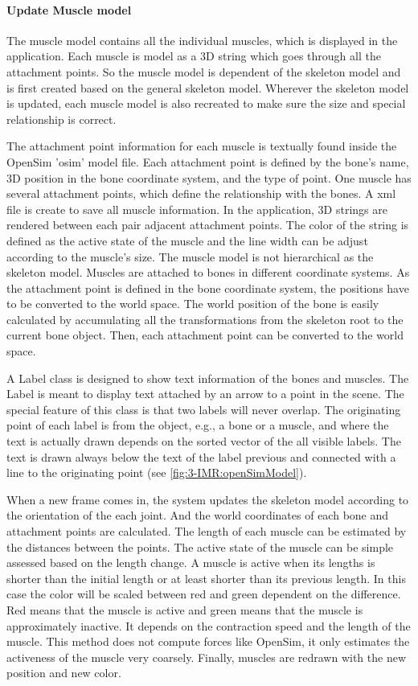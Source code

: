 \paragraph{Update Muscle model}
The muscle model contains all the individual muscles, which is displayed in the application. Each muscle is model as a 3D string which goes through all the attachment points. So the muscle model is dependent of the skeleton model and is first created based on the general skeleton model. Wherever the skeleton model is updated, each muscle model is also recreated to make sure the size and special relationship is correct. 

The attachment point information for each muscle is textually found inside the OpenSim 'osim' model file. Each attachment point is defined by the bone's name, 3D position in the bone coordinate system, and the type of point. One muscle has several attachment points, which define the relationship with the bones. A xml file is create to save all muscle information.
In the application, 3D strings are rendered between each pair adjacent attachment points. 
The color of the string is defined as the active state of the muscle and the line width can be adjust according to the muscle's size. The muscle model is not hierarchical as the skeleton model. Muscles are attached to bones in different coordinate systems. As the attachment point is defined in the bone coordinate system, the positions have to be converted to the world space. The world position of the bone is easily calculated by accumulating all the transformations from the skeleton root to the current bone object. Then, each attachment point can be converted to the world space.

A Label class is designed to show text information of the bones and muscles. The Label is meant to display text attached by an arrow to a point in the scene. The special feature of this class is that two labels will never overlap. The originating point of each label is from the object, e.g., a bone or a muscle, and where the text is actually drawn depends on the sorted vector of the all visible labels. The text is drawn always below the text of the label previous and connected with a line to the originating point (see \figurename{\ref{fig:3-IMR:openSimModel}}).

When a new frame comes in, the system updates the skeleton model according to the orientation of the each joint. And the world coordinates of each bone and attachment points are calculated. The length of each muscle can be estimated by the distances between the points. The active state of the muscle can be simple assessed based on the length change. A muscle is active when its lengths is shorter than the initial length or at least shorter than its previous length.  In this case the color will be scaled between red and green dependent on the difference. Red means that the muscle is active and green means that the muscle is approximately inactive. It depends on the contraction speed and the length of the muscle. This method does not compute forces like OpenSim, it only estimates the activeness of the muscle very coarsely. Finally, muscles are redrawn with the new position and new color.

